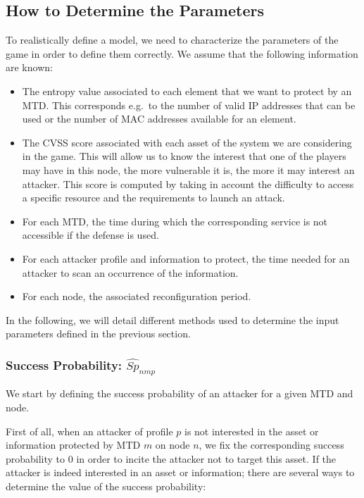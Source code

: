 
\subsection{How to Determine the Parameters}
\label{param-method}

To realistically define a model, we need to characterize the parameters of the game in order to define them correctly.
We assume that the following information are known:

\begin{itemize}
	\item The entropy value associated to each element that we want to protect by an MTD. This corresponds e.g.~to the number of valid IP addresses that can be used or the number of MAC addresses available for an element.
	\item The CVSS score associated with each asset of the system we are considering in the game. This will allow us to know the interest that one of the players may have in this node, the more vulnerable it is, the more it may interest an attacker. This score is computed by taking in account the difficulty to access a specific resource and the requirements to launch an attack.
	\item For each MTD, the time during which the corresponding service is not accessible if the defense is used.
	\item For each attacker profile and information to protect, the time needed for an attacker to scan an occurrence of the information.
	\item For each node, the associated reconfiguration period.
\end{itemize}

In the following, we will detail different methods used to determine the input parameters defined in the previous section.

\label{methodo}

\subsubsection{Success Probability: $\widehat{Sp}_{nmp}$}

We start by defining the success probability of an attacker for a given MTD and node.

First of all, when an attacker of profile $p$ is not interested in the asset or information protected by MTD $m$ on node $n$, we fix the corresponding success probability to $0$ in order to incite the attacker not to target this asset.
If the attacker is indeed interested in an asset or information; there are several ways to determine the value of the success probability:

